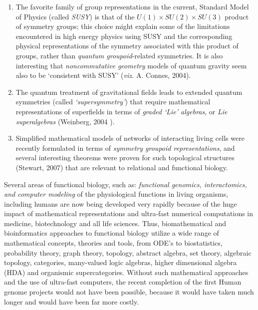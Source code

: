 \documentclass[12pt]{article}
\theoremstyle{plain}
\theoremstyle{definition}
\numberwithin{equation}{section}
\newcommand{\<}{{\langle}}
\begin{document}
\begin{enumerate}
\item The favorite family of group representations in the current, Standard Model of Physics (called \emph{SUSY}) is that of the $U(1) \times SU(2) \times SU(3)$ product of symmetry groups; this choice might explain some of the limitations encountered in high energy physics using SUSY and the corresponding physical representations of the symmetry associated with this product of groups, rather than \emph{quantum groupoid}-related symmetries. It is also interesting that \emph{noncommutative geometry} models of quantum gravity seem also to be `consistent with SUSY' (\emph{viz.} A. Connes, 2004). 
 
\item The quantum treatment of gravitational fields leads to extended quantum symmetries 
(called \emph{`supersymmetry'}) that require mathematical representations of superfields in terms of 
\emph{graded `Lie' algebras}, or \emph{Lie superalgebras} (Weinberg, 2004 \cite{SW2k4}).

\item Simplified mathematical models of networks of interacting living cells were recently formulated
in terms of \emph{symmetry groupoid representations}, and several interesting theorems were proven for such 
topological structures (Stewart, 2007) that are relevant to relational and functional biology.  

\end{enumerate}

Several areas of functional biology, such as:  \emph{functional genomics, interactomics,
and computer modeling} of the physiological functions in living organisms, including humans
are now being developed very rapidly because of the huge impact of mathematical representations
and ultra-fast numerical computations in medicine, biotechnology and all life sciences. 
Thus, biomathematical and bioinformatics approaches to functional biology 
utilize a wide range of mathematical concepts, theories and tools, from ODE's to biostatistics, 
probability theory, graph theory, topology, abstract algebra, set theory, algebraic topology, categories, 
many-valued logic algebras, higher dimensional algebra (HDA) and organismic supercategories. 
Without such mathematical approaches and the use of ultra-fast computers, the recent completion of the first 
Human genome projects would not have been possible, because it would have taken much longer and 
would have been far more costly.  
\end{document}
